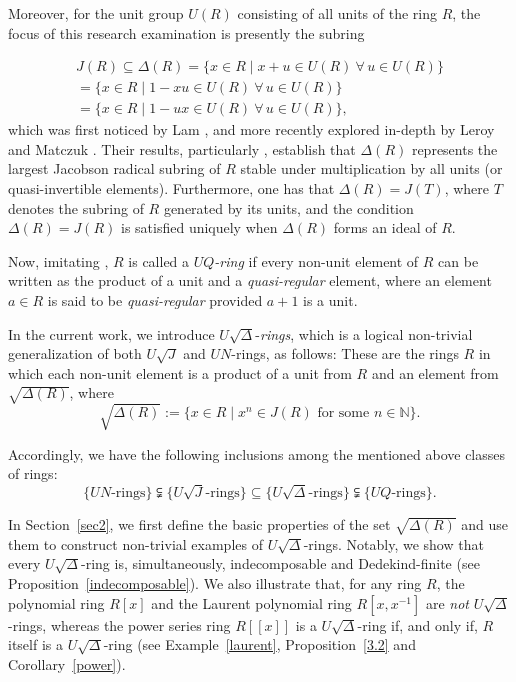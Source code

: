 \documentclass[11pt]{amsart}
\theoremstyle{definition}
\begin{document}
Moreover, for the unit group $U(R)$ consisting of all units of the ring $R$, the focus of this research examination is presently the subring

\[
\begin{aligned}
J(R) \subseteq \Delta(R)=\{x\in R \mid x+u\in U(R)\ \forall\,u\in U(R)\}
\\[2mm]=
\{x\in R \mid 1-xu\in U(R)\ \forall\,u\in U(R)\}
\\[2mm]=
\{x\in R \mid 1-ux\in U(R)\ \forall\,u\in U(R)\},
\end{aligned}
\]
which was first noticed by Lam \cite[4.24]{lamm}, and more recently explored in-depth by Leroy and Matczuk \cite{2}. Their results, particularly \cite[3  6]{2}, establish that \(\Delta(R)\) represents the largest Jacobson radical subring of \(R\) stable under multiplication by all units (or quasi-invertible elements). Furthermore, one has that $\Delta(R) = J(T)$, where \(T\) denotes the subring of \(R\) generated by its units, and the condition \(\Delta(R)=J(R)\) is satisfied uniquely when \(\Delta(R)\) forms an ideal of \(R\).

Now, imitating \cite{Udar2}, \( R \) is called a {\it $UQ$-ring} if every non-unit element of \( R \) can be written as the product of a unit and a {\it quasi-regular} element, where an element \( a \in R \) is said to be {\it quasi-regular} provided \( a + 1 \) is a unit.

In the current work, we introduce $U\sqrt{\Delta}$-{\it rings}, which is a logical non-trivial generalization of both $U\sqrt{J}$ and $UN$-rings, as follows: These are the rings $R$ in which each non-unit element is a product of a unit from $R$ and an element from $\sqrt{\Delta(R)}$, where $$\sqrt{\Delta(R)} := \{ x \in R \mid x^n \in J(R) \text{ for some } n \in \mathbb{N} \}.$$

Accordingly, we have the following inclusions among the mentioned above classes of rings:
\[
\{UN\text{-rings}\} \subsetneqq \{U\sqrt{J}\text{-rings}\} \subseteq{\{U\sqrt{\Delta}\text{-rings}\}} \subsetneqq \{UQ\text{-rings}\}.
\]

In Section~\ref{sec2}, we first define the basic properties of the set $\sqrt{\Delta(R)}$ and use them to construct non-trivial examples of $U\sqrt{\Delta}$-rings. Notably, we show that every $U\sqrt{\Delta}$-ring is, simultaneously, indecomposable and Dedekind-finite (see Proposition~\ref{indecomposable}). We also illustrate that, for any ring $R$, the polynomial ring $R[x]$ and the Laurent polynomial ring $R[x,x^{-1}]$ are {\it not} $U\sqrt{\Delta}$-rings, whereas the power series ring $R[[x]]$ is a $U\sqrt{\Delta}$-ring if, and only if, $R$ itself is a $U\sqrt{\Delta}$-ring (see Example~\ref{laurent}, Proposition~\ref{3.2} and Corollary~\ref{power}).
\end{document}
